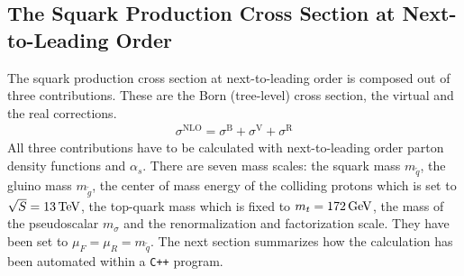 \subsection{The Squark Production Cross Section at Next-to-Leading Order}
The squark production cross section at next-to-leading order is composed out of three contributions. These are the Born (tree-level) cross section, the virtual and the real corrections. 
\begin{align}
\sigma^{\mathrm{NLO}} = \sigma^{\mathrm{B}} + \sigma^{\mathrm{V}} + \sigma^{\mathrm{R}}\label{eq:BVR}
\end{align}
All three contributions have to be calculated with next-to-leading order parton density functions and $\alpha_s$. There are seven mass scales: the squark mass $m_{\tilde{q}}$, the gluino mass $m_{\tilde{g}}$, the center of mass energy of the colliding protons which is set to $\sqrt{S} = \unit[13]{TeV}$, the top-quark mass which is fixed to $m_t = \unit[172]{GeV}$, the mass of the pseudoscalar $m_{\sigma}$ and the renormalization and factorization scale. They have been set to $\mu_F = \mu_R = m_{\tilde{q}}$. The next section summarizes how the calculation has been automated within a \texttt{C++} program.


